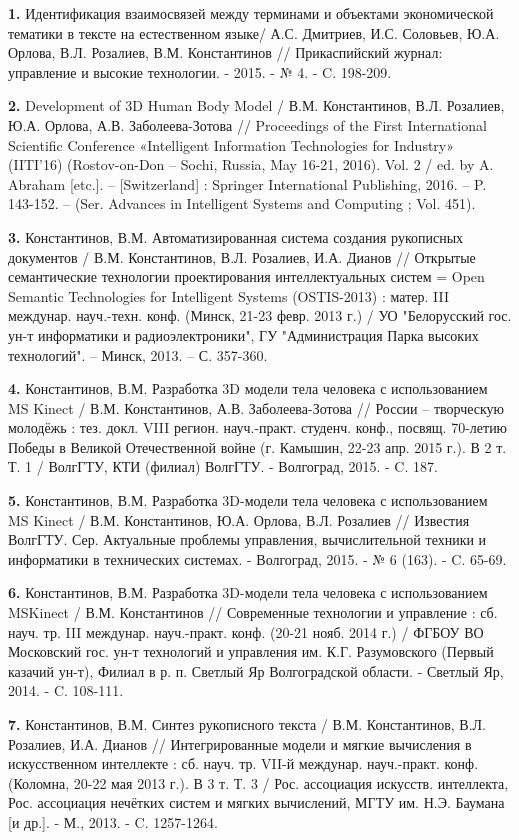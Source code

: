 {\textbf{1.}}  Идентификация взаимосвязей между терминами и объектами экономической тематики в тексте на естественном языке/ А.С. Дмитриев, И.С. Соловьев, Ю.А. Орлова, В.Л. Розалиев, В.М. Константинов // Прикаспийский журнал: управление и высокие технологии. - 2015. - № 4. - C. 198-209.

{\textbf{2.}} Development of 3D Human Body Model / В.М. Константинов, В.Л. Розалиев, Ю.А. Орлова, А.В. Заболеева-Зотова // Proceedings of the First International Scientific Conference «Intelligent Information Technologies for Industry» (IITI’16) (Rostov-on-Don – Sochi, Russia, May 16-21, 2016). Vol. 2 / ed. by A. Abraham [etc.]. – [Switzerland] : Springer International Publishing, 2016. – P. 143-152. – (Ser. Advances in Intelligent Systems and Computing ; Vol. 451).

{\textbf{3.}} Константинов, В.М. Автоматизированная система создания рукописных документов / В.М. Константинов, В.Л. Розалиев, И.А. Дианов // Открытые семантические технологии проектирования интеллектуальных систем = Open Semantic Technologies for Intelligent Systems (OSTIS-2013) : матер. III междунар. науч.-техн. конф. (Минск, 21-23 февр. 2013 г.) / УО "Белорусский гос. ун-т информатики и радиоэлектроники", ГУ "Администрация Парка высоких технологий". – Минск, 2013. – С. 357-360.

{\textbf{4.}} Константинов, В.М. Разработка 3D модели тела человека с использованием MS Kinect / В.М. Константинов, А.В. Заболеева-Зотова // России – творческую молодёжь : тез. докл. VIII регион. науч.-практ. студенч. конф., посвящ. 70-летию Победы в Великой Отечественной войне (г. Камышин, 22-23 апр. 2015 г.). В 2 т. Т. 1 / ВолгГТУ, КТИ (филиал) ВолгГТУ. - Волгоград, 2015. - C. 187.

{\textbf{5.}} Константинов, В.М. Разработка 3D-модели тела человека с использованием MS Kinect / В.М. Константинов, Ю.А. Орлова, В.Л. Розалиев // Известия ВолгГТУ. Сер. Актуальные проблемы управления, вычислительной техники и информатики в технических системах. - Волгоград, 2015. - № 6 (163). - C. 65-69.

{\textbf{6.}} Константинов, В.М. Разработка 3D-модели тела человека с использованием MSKinect / В.М. Константинов // Современные технологии и управление : сб. науч. тр. III междунар. науч.-практ. конф. (20-21 нояб. 2014 г.) / ФГБОУ ВО Московский гос. ун-т технологий и управления им. К.Г. Разумовского (Первый казачий ун-т), Филиал в р. п. Светлый Яр Волгоградской области. - Светлый Яр, 2014. - C. 108-111.

{\textbf{7.}} Константинов, В.М. Синтез рукописного текста / В.М. Константинов, В.Л. Розалиев, И.А. Дианов // Интегрированные модели и мягкие вычисления в искусственном интеллекте : сб. науч. тр. VII-й междунар. науч.-практ. конф. (Коломна, 20-22 мая 2013 г.). В 3 т. Т. 3 / Рос. ассоциация искусств. интеллекта, Рос. ассоциация нечётких систем и мягких вычислений, МГТУ им. Н.Э. Баумана [и др.]. - М., 2013. - C. 1257-1264.

